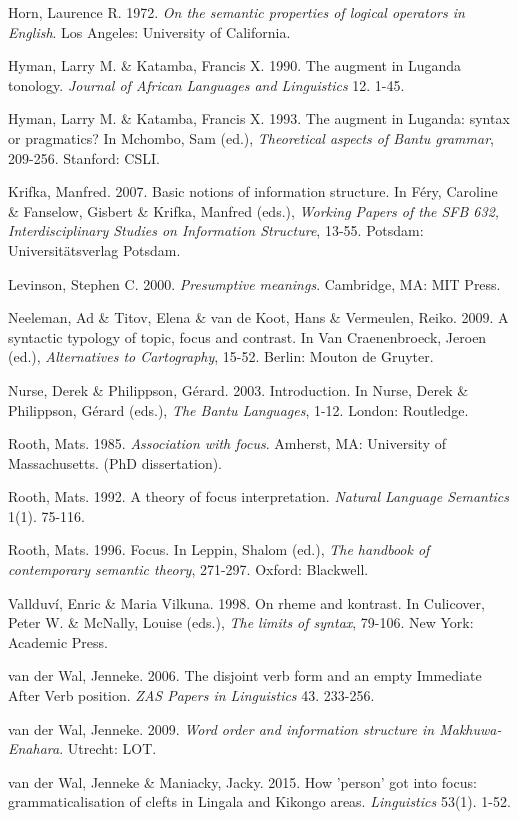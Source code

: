 \documentclass[output=paper]{langsci/langscibook}
\begin{document}
Horn, Laurence R. 1972. \textit{On the semantic properties of logical operators in English}. Los Angeles: University of California.

Hyman, Larry M. \& Katamba, Francis X. 1990. The augment in Luganda tonology. \textit{Journal of African Languages and Linguistics} 12. 1-45.

Hyman, Larry M. \& Katamba, Francis X. 1993. The augment in Luganda: syntax or pragmatics? In Mchombo, Sam (ed.), \textit{Theoretical aspects of Bantu grammar}, 209-256. Stanford: CSLI.

Krifka, Manfred. 2007. Basic notions of information structure. In Féry, Caroline \& Fanselow, Gisbert \& Krifka, Manfred (eds.), \textit{Working Papers of the SFB 632, Interdisciplinary Studies on Information Structure}, 13-55. Potsdam: Universitätsverlag Potsdam.

Levinson, Stephen C. 2000. \textit{Presumptive meanings}. Cambridge, MA: MIT Press.

Neeleman, Ad \& Titov, Elena \& van de Koot, Hans \& Vermeulen, Reiko. 2009. A syntactic typology of topic, focus and contrast. In Van Craenenbroeck, Jeroen (ed.), \textit{Alternatives to Cartography}, 15-52. Berlin: Mouton de Gruyter.

Nurse, Derek \& Philippson, Gérard. 2003. Introduction. In Nurse, Derek \& Philippson, Gérard (eds.), \textit{The Bantu Languages}, 1-12. London: Routledge.

Rooth, Mats. 1985. \textit{Association with focus}. Amherst, MA: University of Massachusetts. (PhD dissertation).

Rooth, Mats. 1992. A theory of focus interpretation. \textit{Natural Language Semantics} 1(1). 75-116.

Rooth, Mats. 1996. Focus. In Leppin, Shalom (ed.), \textit{The handbook of contemporary semantic theory}, 271-297. Oxford: Blackwell.

Vallduví, Enric \& Maria Vilkuna. 1998. On rheme and kontrast. In Culicover, Peter W. \& McNally, Louise (eds.), \textit{The limits of syntax}, 79-106. New York: Academic Press.

van der Wal, Jenneke. 2006. The disjoint verb form and an empty Immediate After Verb position. \textit{ZAS Papers in Linguistics} 43. 233-256.

van der Wal, Jenneke. 2009. \textit{Word order and information structure in Makhuwa-Enahara}. Utrecht: LOT.

van der Wal, Jenneke \& Maniacky, Jacky. 2015. How 'person' got into focus: grammaticalisation of clefts in Lingala and Kikongo areas. \textit{Linguistics} 53(1). 1-52.
\end{document}
